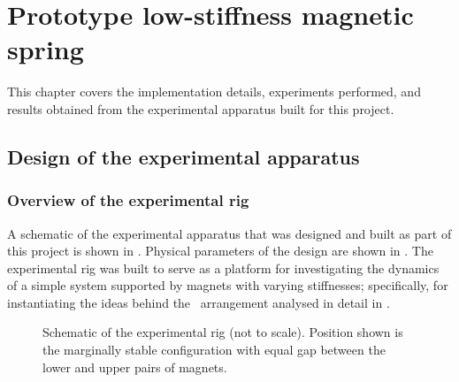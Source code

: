 
\chapter{Prototype low-stiffness magnetic spring}


This chapter covers the implementation details, experiments performed,
and results obtained from the experimental apparatus built for this
project.

\section{Design of the experimental apparatus}

\subsection{Overview of the experimental rig}

A schematic of the experimental apparatus that was designed and built as part
of this project is shown in . Physical parameters of the design
are shown in . The experimental rig was built to serve as a
platform for investigating the dynamics of a simple system supported by
magnets with varying stiffnesses; specifically, for instantiating the ideas
behind the \qzs\ arrangement analysed in detail in .

\begin{figure}
  \caption{Schematic of the experimental rig (not to scale). Position shown is the marginally
  stable configuration with equal gap between the lower and upper pairs
  of magnets.}
\end{figure}


